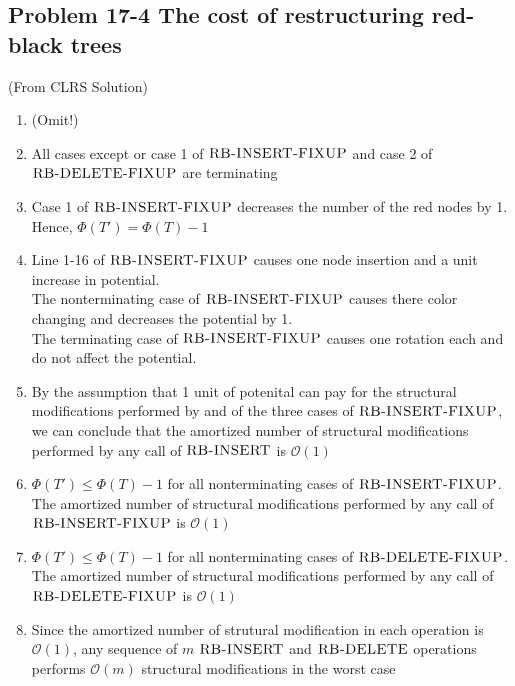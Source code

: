 \subsection*{Problem 17-4 The cost of restructuring red-black trees}
(From CLRS Solution)
\begin{enumerate}
	\item	(Omit!)
	\item	All cases except or case 1 of $\textnormal{\scshape RB-INSERT-FIXUP}$ and case 2 of $\textnormal{\scshape RB-DELETE-FIXUP}$ are terminating
	\item	Case 1 of $\textnormal{\scshape RB-INSERT-FIXUP}$ decreases the number of the red nodes by 1. Hence, $\Phi(T') = \Phi(T) - 1$
	\item	Line 1-16 of $\textnormal{\scshape RB-INSERT-FIXUP}$ causes one node insertion and a unit increase in potential. \\
		The nonterminating case of $\textnormal{\scshape RB-INSERT-FIXUP}$ causes there color changing and decreases the potential by 1. \\
		The terminating case of $\textnormal{\scshape RB-INSERT-FIXUP}$ causes one rotation each and do not affect the potential.
	\item	By the assumption that 1 unit of potenital can pay for the structural modifications performed by and of the three cases of $\textnormal{\scshape RB-INSERT-FIXUP}$, we can conclude that the amortized number of structural modifications performed by any call of $\textnormal{\scshape RB-INSERT}$ is $\mathcal{O}(1)$
	\item	$\Phi(T') \leq \Phi(T) - 1$ for all nonterminating cases of $\textnormal{\scshape RB-INSERT-FIXUP}$. \\
		The amortized number of structural modifications performed by any call of $\textnormal{\scshape RB-INSERT-FIXUP}$ is $\mathcal{O}(1)$
	\item	$\Phi(T') \leq \Phi(T) - 1$ for all nonterminating cases of $\textnormal{\scshape RB-DELETE-FIXUP}$. \\
		The amortized number of structural modifications performed by any call of $\textnormal{\scshape RB-DELETE-FIXUP}$ is $\mathcal{O}(1)$
	\item	Since the amortized number of strutural modification in each operation is $\mathcal{O}(1)$, any sequence of $m$ $\textnormal{\scshape RB-INSERT}$ and $\textnormal{\scshape RB-DELETE}$ operations performs $\mathcal{O}(m)$ structural modifications in the worst case
\end{enumerate}

